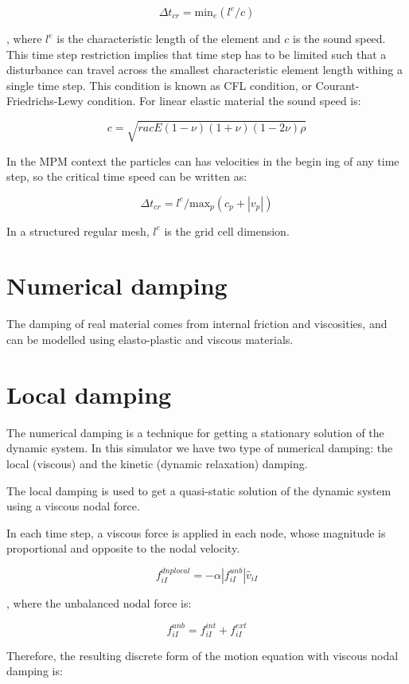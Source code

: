 \documentclass[11pt,a4paper]{article}
\begin{document}
$$ \Delta t_{cr} = \text{min}_e (l^e / c )  $$

, where  $ l^e  $ is the characteristic length of the element and  $ c  $ is the sound speed. This time step restriction implies that time step has to be limited such that a disturbance can travel across the smallest characteristic element length withing a single time step. This condition is known as CFL condition, or Courant-Friedrichs-Lewy condition. For linear elastic material the sound speed is:

$$ c = \sqrt{  rac {E (1-\nu)} {(1+\nu)(1-2\nu)\rho}} $$

In the MPM context the particles can has velocities in the begin ing of any time step, so the critical time speed can be written as:

$$ \Delta t_{cr} = l^e / \text{max}_p ( c_p +  |v_p| ) $$

In a structured regular mesh,  $ l^e  $ is the grid cell dimension.

\section{ Numerical damping }

The damping of real material comes from internal friction and viscosities, and can be modelled using elasto-plastic and viscous materials.

\section{ Local damping }

The numerical damping is a technique for getting a stationary solution of the dynamic system. In this simulator we have two type of numerical damping: the local (viscous) and the kinetic (dynamic relaxation) damping.

The local damping is used to get a quasi-static solution of the dynamic system using a viscous nodal force.

In each time step, a viscous force is applied in each node, whose magnitude is proportional and opposite to the nodal velocity.

$$ f_{iI}^{dnplocal} = - \alpha |f_{iI}^{unb}| \hat{v}_{iI} $$

, where the unbalanced nodal force is:

$$ f_{iI}^{unb} =  f_{iI}^{int} + f_{iI}^{ext} $$

Therefore, the resulting discrete form of the motion equation with viscous nodal damping is:
\end{document}
